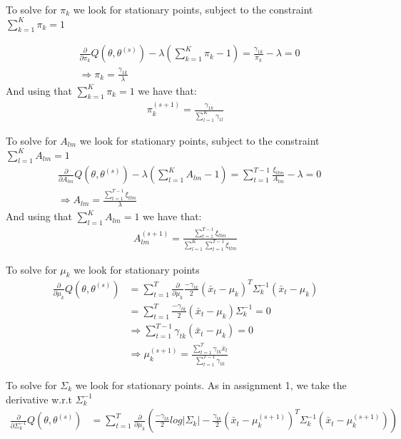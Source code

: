 \documentclass[paper=a4, fontsize=11pt]{scrartcl} %
\numberwithin{equation}{section} %
\numberwithin{figure}{section} %
\numberwithin{table}{section} %
\begin{document}
To solve for \(\pi_k\) we look for stationary points, subject to the constraint \(\sum_{k=1}^K\pi_k = 1\)

\begin{align}
&\frac{\partial}{\partial\pi_k} Q(\theta, \theta^{(s)}) - \lambda \left(\sum_{k=1}^K\pi_k - 1 \right) = \frac{\gamma_{1k}}{\pi_k}-\lambda = 0\\
&\Rightarrow \pi_k = \frac{\gamma_{1k}}{\lambda}
\end{align}
And using that \(\sum_{k=1}^K\pi_k = 1\) we have that:
\begin{align}
\pi_k^{(s+1)} = \frac{\gamma_{1k}}{\sum_{l=1}^K\gamma_{1l}}
\end{align}

To solve for \(A_{lm}\) we look for stationary points, subject to the constraint \(\sum_{l=1}^K A_{lm} = 1\)
\begin{align}
&\frac{\partial}{\partial A_{lm}} Q(\theta, \theta^{(s)}) - \lambda \left(\sum_{l=1}^K A_{lm} - 1 \right) = \sum_{t=1}^{T-1}\frac{\xi_{tlm}}{A_{lm}}-\lambda = 0\\
&\Rightarrow A_{lm} = \frac{\sum_{t=1}^{T-1}\xi_{tlm}}{\lambda}
\end{align}
And using that \(\sum_{l=1}^K A_{lm} = 1\) we have that:
\begin{align}
A_{lm}^{(s+1)} = \frac{\sum_{t=1}^{T-1}\xi_{tlm}}{\sum_{l=1}^K\sum_{t=1}^{T-1}\xi_{tlm}}
\end{align}

To solve for \(\mu_k\) we look for stationary points
\begin{align}
\frac{\partial}{\partial \mu_{k}} Q(\theta, \theta^{(s)}) &= \sum_{t=1}^{T}\frac{\partial}{\partial \mu_{k}}\frac{-\gamma_{tk}}{2}(\bar{x}_t-\mu_k)^T\Sigma_k^{-1}(\bar{x}_t-\mu_k) \\
&=\sum_{t=1}^{T}\frac{-\gamma_{tk}}{2}(\bar{x}_t-\mu_k)\Sigma_k^{-1}=0\\
&\Rightarrow \sum_{t=1}^{T-1}\gamma_{tk}(\bar{x}_t-\mu_k)=0\\
&\Rightarrow \mu_k^{(s+1)} = \frac{\sum_{t=1}^{T}\gamma_{tk}\bar{x}_t}{\sum_{t=1}^{T-1}\gamma_{tk}}
\end{align}

To solve for \(\Sigma_k\) we look for stationary points. As in assignment 1, we take the derivative w.r.t \(\Sigma^{-1}_k\)
\begin{align}
\frac{\partial}{\partial \Sigma^{-1}_{k}} Q(\theta, \theta^{(s)}) &= \sum_{t=1}^{T}\frac{\partial}{\partial \mu_{k}}\left(\frac{-\gamma_{tk}}{2}log|\Sigma_k| -\frac{\gamma_{tk}}{2}\left(\bar{x}_t-\mu_k^{(s+1)}\right)^T\Sigma_k^{-1}\left(\bar{x}_t-\mu_k^{(s+1)}\right)\right)
\end{align}
\end{document}
